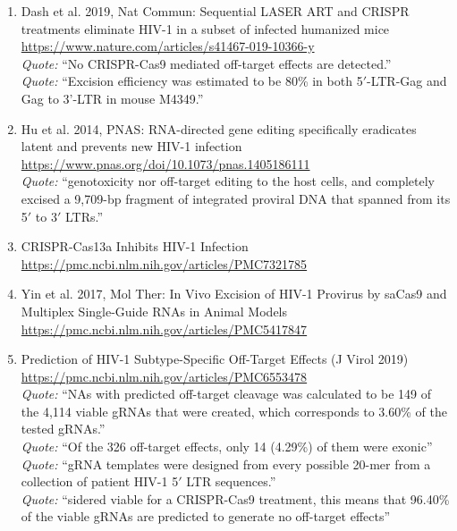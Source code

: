 \begin{enumerate}
\item [4] Dash et al. 2019, Nat Commun: Sequential LASER ART and CRISPR treatments eliminate HIV-1 in a subset of infected humanized mice \\ \url{https://www.nature.com/articles/s41467-019-10366-y}
  \\ {\sloppy \emph{Quote:} ``No CRISPR-Cas9 mediated off-target effects are detected.''}
  \\ {\sloppy \emph{Quote:} ``Excision efficiency was estimated to be 80\% in both 5$'$-LTR-Gag and Gag to 3'-LTR in mouse M4349.''}

\item [6] Hu et al. 2014, PNAS: RNA-directed gene editing specifically eradicates latent and prevents new HIV-1 infection \\ \url{https://www.pnas.org/doi/10.1073/pnas.1405186111}
  \\ {\sloppy \emph{Quote:} ``genotoxicity nor off-target editing to the host cells, and completely excised a 9,709-bp fragment of integrated proviral DNA that spanned from its 5$'$ to 3$'$ LTRs.''}

\item [8] CRISPR-Cas13a Inhibits HIV-1 Infection \\ \url{https://pmc.ncbi.nlm.nih.gov/articles/PMC7321785}

\item [9] Yin et al. 2017, Mol Ther: In Vivo Excision of HIV-1 Provirus by saCas9 and Multiplex Single-Guide RNAs in Animal Models \\ \url{https://pmc.ncbi.nlm.nih.gov/articles/PMC5417847}

\item [11] Prediction of HIV-1 Subtype-Specific Off-Target Effects (J Virol 2019) \\ \url{https://pmc.ncbi.nlm.nih.gov/articles/PMC6553478}
  \\ {\sloppy \emph{Quote:} ``NAs with predicted off-target cleavage was calculated to be 149 of the 4,114 viable gRNAs that were created, which corresponds to 3.60\% of the tested gRNAs.''}
  \\ {\sloppy \emph{Quote:} ``Of the 326 off-target effects, only 14 (4.29\%) of them were exonic''}
  \\ {\sloppy \emph{Quote:} ``gRNA templates were designed from every possible 20-mer from a collection of patient HIV-1 5$'$ LTR sequences.''}
  \\ {\sloppy \emph{Quote:} ``sidered viable for a CRISPR-Cas9 treatment, this means that 96.40\% of the viable gRNAs are predicted to generate no off-target effects''}


\end{enumerate}
